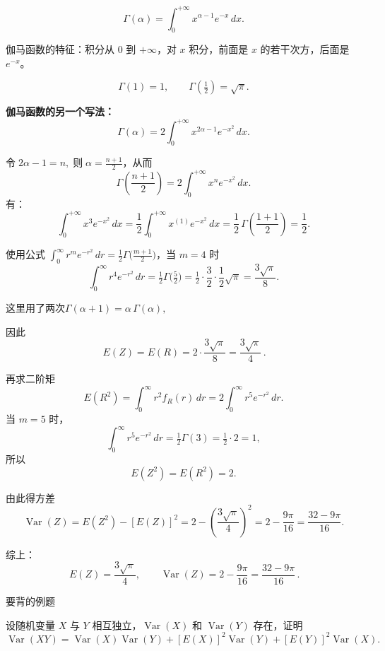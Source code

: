 \begin{solution}
\begin{definition}
\[
\Gamma(\alpha)=\int_{0}^{+\infty} x^{\alpha-1} e^{-x}\,dx.
\]

伽马函数的特征：积分从 $0$ 到 $+\infty$，对 $x$ 积分，前面是 $x$ 的若干次方，后面是 $e^{-x}$。

\[
\Gamma(1)=1,\qquad 
\Gamma\!\left(\tfrac{1}{2}\right)=\sqrt{\pi}.
\]

\bigskip

\textbf{伽马函数的另一个写法：}
\[
\Gamma(\alpha)=2\int_{0}^{+\infty} x^{2\alpha-1} e^{-x^{2}}\,dx.
\]

$令\; 2\alpha-1=n,\; 则\; \alpha=\frac{n+1}{2}$，从而
\[
\Gamma\!\left(\frac{n+1}{2}\right)
=2\int_{0}^{+\infty} x^{n} e^{-x^{2}}\,dx.
\]
有：
\[
\int_{0}^{+\infty} x^{3} e^{-x^{2}}\,dx
= \frac12 \int_{0}^{+\infty} x^{(1)} e^{-x^{2}}\,dx
= \frac12\,\Gamma\!\left(\frac{1+1}{2}\right)
= \frac12.
\]
\end{definition}
使用公式 $\displaystyle\int_0^\infty r^m e^{-r^2}\,dr=\tfrac12\Gamma\!\big(\tfrac{m+1}{2}\big)$，当 $m=4$ 时
\[
\int_0^{\infty} r^4 e^{-r^2}\,dr=\tfrac12\Gamma\!\big(\tfrac{5}{2}\big)
=\tfrac12\cdot\frac{3}{2}\cdot\frac{1}{2}\sqrt{\pi}=\frac{3\sqrt{\pi}}{8}.
\]
\begin{dxtips}
    这里用了两次$\Gamma(\alpha+1)=\alpha\,\Gamma(\alpha),$
\end{dxtips}
因此
\[
\boxed{\,E(Z)=E(R)=2\cdot\frac{3\sqrt{\pi}}{8}=\frac{3\sqrt{\pi}}{4}\,.}
\]

再求二阶矩
\[
E(R^2)=\int_0^{\infty} r^2 f_R(r)\,dr
=2\int_0^{\infty} r^5 e^{-r^2}\,dr.
\]
当 $m=5$ 时，
\[
\int_0^{\infty} r^5 e^{-r^2}\,dr=\tfrac12\Gamma(3)=\tfrac12\cdot 2=1,
\]
所以
\[
\boxed{\,E(Z^2)=E(R^2)=2. \,}
\]

由此得方差
\[
\boxed{\,\operatorname{Var}(Z)=E(Z^2)-[E(Z)]^2
=2-\left(\frac{3\sqrt{\pi}}{4}\right)^2
=2-\frac{9\pi}{16}
=\frac{32-9\pi}{16}. \,}
\]

综上：
\[
\boxed{\,E(Z)=\frac{3\sqrt{\pi}}{4},\qquad \operatorname{Var}(Z)=2-\frac{9\pi}{16}=\frac{32-9\pi}{16}\,.}
\]
\end{solution}
\begin{dxtips}
    要背的例题
\end{dxtips}
\begin{homework}[3.23]
设随机变量 $X$ 与 $Y$ 相互独立，$\operatorname{Var}(X)$ 和 $\operatorname{Var}(Y)$ 存在，证明
\[
\operatorname{Var}(XY) = \operatorname{Var}(X) \operatorname{Var}(Y)
+ [E(X)]^2 \operatorname{Var}(Y)
+ [E(Y)]^2 \operatorname{Var}(X).
\]
\end{homework}
